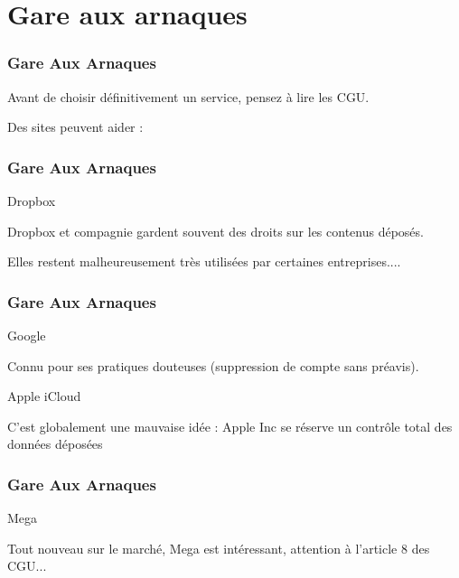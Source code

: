 \documentclass{beamer}
\begin{document}
\section{Gare aux arnaques} %

\begin{frame}
    \frametitle{Gare Aux Arnaques}

    Avant de choisir définitivement un service, pensez à lire les CGU.

    \pause{}

    Des sites peuvent aider :


\end{frame}

\begin{frame}
    \frametitle{Gare Aux Arnaques}

    \begin{block}{Dropbox}

        Dropbox et compagnie gardent souvent des droits sur les contenus déposés.

        Elles restent malheureusement très utilisées par certaines entreprises....

    \end{block}

\end{frame}

\begin{frame}
    \frametitle{Gare Aux Arnaques}

    \begin{block}{Google}

        Connu pour ses pratiques douteuses (suppression de compte sans préavis).

    \end{block}
    
    \pause{}

    \begin{block}{Apple iCloud}

        C'est globalement une mauvaise idée : Apple Inc se réserve un contrôle total des données déposées

    \end{block}


\end{frame}
\begin{frame}
    \frametitle{Gare Aux Arnaques}


    \begin{block}{Mega}

        Tout nouveau sur le marché, Mega est intéressant, attention à l'article 8 des CGU...


    \end{block}
\end{frame}
\end{document}
